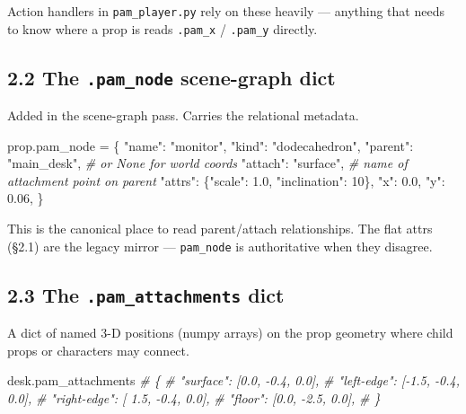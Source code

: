 \documentclass[
  12pt,
  letterpaper,
]{book}
\newenvironment{Shaded}{}{}
\newcommand{\CommentTok}[1]{\textcolor[rgb]{0.38,0.63,0.69}{\textit{#1}}}
\newcommand{\DecValTok}[1]{\textcolor[rgb]{0.25,0.63,0.44}{#1}}
\newcommand{\FloatTok}[1]{\textcolor[rgb]{0.25,0.63,0.44}{#1}}
\newcommand{\NormalTok}[1]{#1}
\newcommand{\OperatorTok}[1]{\textcolor[rgb]{0.40,0.40,0.40}{#1}}
\newcommand{\StringTok}[1]{\textcolor[rgb]{0.25,0.44,0.63}{#1}}
\begin{document}
Action handlers in \texttt{pam\_player.py} rely on these heavily ---
anything that needs to know where a prop is reads \texttt{.pam\_x} /
\texttt{.pam\_y} directly.

\subsection{\texorpdfstring{2.2 The \texttt{.pam\_node} scene-graph
dict}{2.2 The .pam\_node scene-graph dict}}\label{the-.pam_node-scene-graph-dict}

Added in the scene-graph pass. Carries the relational metadata.

\begin{Shaded}
\begin{Highlighting}[]
\NormalTok{prop.pam\_node }\OperatorTok{=}\NormalTok{ \{}
    \StringTok{"name"}\NormalTok{:   }\StringTok{"monitor"}\NormalTok{,}
    \StringTok{"kind"}\NormalTok{:   }\StringTok{"dodecahedron"}\NormalTok{,}
    \StringTok{"parent"}\NormalTok{: }\StringTok{"main\_desk"}\NormalTok{,     }\CommentTok{\# or None for world coords}
    \StringTok{"attach"}\NormalTok{: }\StringTok{"surface"}\NormalTok{,       }\CommentTok{\# name of attachment point on parent}
    \StringTok{"attrs"}\NormalTok{:  \{}\StringTok{"scale"}\NormalTok{: }\FloatTok{1.0}\NormalTok{, }\StringTok{"inclination"}\NormalTok{: }\DecValTok{10}\NormalTok{\},}
    \StringTok{"x"}\NormalTok{:      }\FloatTok{0.0}\NormalTok{,}
    \StringTok{"y"}\NormalTok{:      }\FloatTok{0.06}\NormalTok{,}
\NormalTok{\}}
\end{Highlighting}
\end{Shaded}

This is the canonical place to read parent/attach relationships. The
flat attrs (§2.1) are the legacy mirror --- \texttt{pam\_node} is
authoritative when they disagree.

\subsection{\texorpdfstring{2.3 The \texttt{.pam\_attachments}
dict}{2.3 The .pam\_attachments dict}}\label{the-.pam_attachments-dict}

A dict of named 3-D positions (numpy arrays) on the prop geometry where
child props or characters may connect.

\begin{Shaded}
\begin{Highlighting}[]
\NormalTok{desk.pam\_attachments}
\CommentTok{\# \{}
\CommentTok{\#   "surface":    [0.0, {-}0.4, 0.0],}
\CommentTok{\#   "left{-}edge":  [{-}1.5, {-}0.4, 0.0],}
\CommentTok{\#   "right{-}edge": [ 1.5, {-}0.4, 0.0],}
\CommentTok{\#   "floor":      [0.0, {-}2.5, 0.0],}
\CommentTok{\# \}}
\end{Highlighting}
\end{Shaded}
\end{document}
